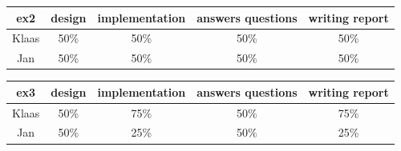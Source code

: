\documentclass[a4paper]{article}
\begin{document}
\begin{table}[H]
\centering
\begin{tabular}{ccccc}
ex2 & design & implementation & answers questions & writing report \\
\hline
Klaas & 50\% & 50\% & 50\% & 50\% \\
\hline
Jan & 50\% & 50\% & 50\% & 50\% \\
\end{tabular}
\end{table}

\begin{table}[H]
\centering
\begin{tabular}{ccccc}
ex3 & design & implementation & answers questions & writing report \\
\hline
Klaas & 50\% & 75\% & 50\% & 75\% \\
\hline
Jan & 50\% & 25\% & 50\% & 25\% \\
\end{tabular}
\end{table} 
\end{document}
